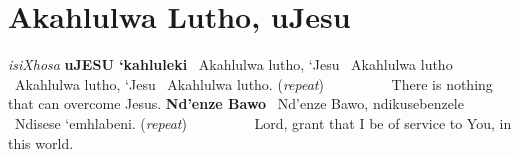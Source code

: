 \starttocol
\chapter{Akahlulwa Lutho, uJesu}
\nexttocol
\hfill{\it isiXhosa}
\stoptocol
\starttocol
\startlines
{\bf uJ{\small\bf ESU} `kahluleki}
 ~Akahlulwa lutho, `Jesu
 ~Akahlulwa lutho 
 ~Akahlulwa lutho, `Jesu
 ~Akahlulwa lutho.  \hfill({\it repeat})~~~~~~~~~
\stoplines
\nexttocol
There is nothing that can overcome Jesus.
\stoptocol
\starttocol
\startlines
{\bf Nd'enze Bawo}
 ~Nd'enze Bawo, ndikusebenzele
 ~Ndisese `emhlabeni. \hfill({\it repeat})~~~~~~~~~
\stoplines
\nexttocol
Lord, grant that I be of service to You, in this world.
\stoptocol
